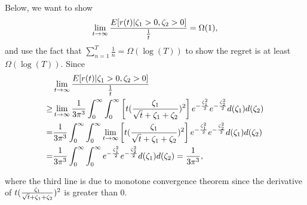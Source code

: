 Below, we want to show 
\begin{align}
\lim_{t\rightarrow\infty}\frac{E[r(t)| \Noise{1}>0, \Noise{2}>0]}{\frac{1}{t}} = \Omega(1), \nonumber
\end{align}
and use the fact that $\sum_{n=1}^{T}\frac{1}{n}=\Omega(\log(T))$ to show the regret is at least $\Omega(\log(T))$. Since
\begin{align}
&\lim_{t\rightarrow \infty}\frac{E[r(t)| \Noise{1}>0, \Noise{2}>0]}{\frac{1}{t}} \nonumber \\
\geq & \lim_{t\rightarrow \infty}\frac{1}{3\pi^3}\int_{0}^{\infty} \int_{0}^{\infty}\left[ t(\frac{\Noise{1}}{\sqrt{t}+\Noise{1}+\Noise{2}})^2\right]e^{-\frac{\Noise{1}^2}{2}}e^{-\frac{\Noise{2}^2}{2}}d(\Noise{1})d(\Noise{2}) \nonumber  \\
= & \frac{1}{3\pi^3}\int_{0}^{\infty} \int_{0}^{\infty}\lim_{t\rightarrow \infty}\left[ t(\frac{\Noise{1}}{\sqrt{t}+\Noise{1}+\Noise{2}})^2\right]e^{-\frac{\Noise{1}^2}{2}}e^{-\frac{\Noise{2}^2}{2}}d(\Noise{1})d(\Noise{2}) \nonumber  \\
=&\frac{1}{3\pi^3}\int_{0}^{\infty} \int_{0}^{\infty}e^{-\frac{\Noise{1}^2}{2}}e^{-\frac{\Noise{2}^2}{2}}d(\Noise{1})d(\Noise{2}) = \frac{1}{3\pi^3}, \nonumber
\end{align}

where the third line is due to monotone convergence theorem since the derivative of $t(\frac{\Noise{1}}{\sqrt{t}+\Noise{1}+\Noise{2}})^2$ is greater than $0$.



 
